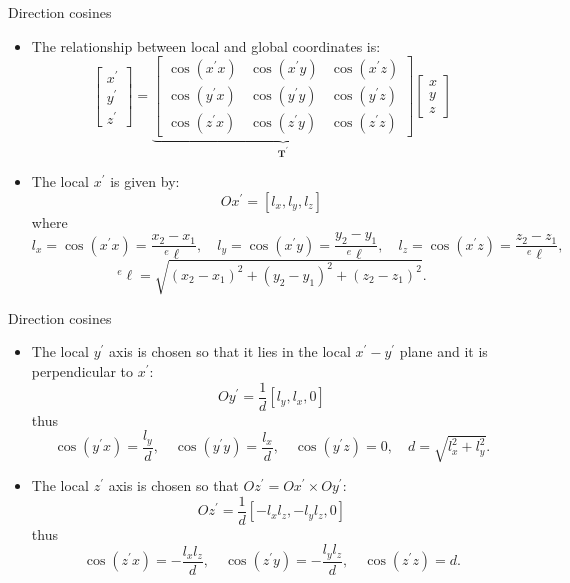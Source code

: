 \documentclass[aspectratio=169]{beamer}
\begin{document}
\begin{frame}{Direction cosines}
  \begin{itemize}
    \item The relationship between local and global coordinates is:
          $$ \left[
              \begin{array}{c}
                x^\prime \\
                y^\prime \\
                z^\prime
              \end{array}
              \right]
            =\underbrace{ \left[
                \begin{array}{ccc}
                  \cos(x^\prime x) & \cos (x^\prime y) & \cos (x^\prime z) \\
                  \cos(y^\prime x) & \cos (y^\prime y) & \cos (y^\prime z) \\
                  \cos(z^\prime x) & \cos (z^\prime y) & \cos (z^\prime z)
                \end{array}
                \right]}_\text{$\mathbf {T^\prime}$}
            \left[
              \begin{array}{c}
                x \\
                y \\
                z
              \end{array}
              \right]$$
    \item The local $x^\prime$ is given by:
          $$Ox^\prime=\left[l_x,l_y,l_z \right]$$
          where
          $$l_x=\cos(x^\prime x)=\frac{x_2-x_1}{{}^e\ell},\quad l_y=\cos (x^\prime y)=\frac{y_2-y_1}{{}^e\ell},\quad l_z=\cos (x^\prime z)=\frac{z_2-z_1}{{}^e\ell},$$
          $$^e\ell=\sqrt{(x_2-x_1)^2+(y_2-y_1)^2+(z_2-z_1)^2}.$$
  \end{itemize}
\end{frame}

\begin{frame}{Direction cosines}
  \begin{itemize}
    \item The local $y^\prime$ axis is chosen so that it lies in the local $x^\prime-y^\prime$ plane and it is perpendicular to $x^\prime$:
          $$Oy^\prime=\frac{1}{d}\left[l_y,l_x,0 \right]$$
          thus
          $$\cos(y^\prime x)=\frac{l_y}{d},\quad \cos (y^\prime y)=\frac{l_x}{d},\quad \cos (y^\prime z)=0,\quad d=\sqrt{l_x^2+l_y^2}.$$
    \item The local $z^\prime$ axis is chosen so that $Oz^\prime= Ox^\prime\times Oy^\prime$:
          $$Oz^\prime=\frac{1}{d}\left[-l_xl_z,-l_yl_z,0 \right]$$
          thus
          $$\cos(z^\prime x)=-\frac{l_xl_z}{d},\quad \cos (z^\prime y)=-\frac{l_yl_z}{d},\quad \cos (z^\prime z)=d.$$
  \end{itemize}
\end{frame}
\end{document}
